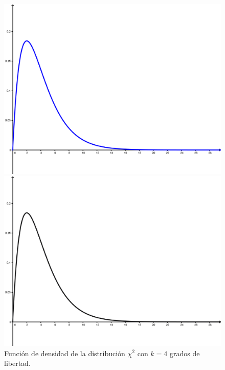 \begin{figure}[htb]
\begin{center}
\begin{enColor}
\includegraphics[width=12.5cm]{../fig/Cap06-DensidadChiCuadrado.png}
\end{enColor}
\begin{bn}
\includegraphics[width=12.5cm]{../fig/Cap06-DensidadChiCuadrado-bn.png}
\end{bn}
\caption{Función de densidad de la distribución $\chi^2$ con $k=4$ grados de libertad.}
\label{cap06:fig:DensidadChiCuadrado}
\end{center}
\end{figure}

